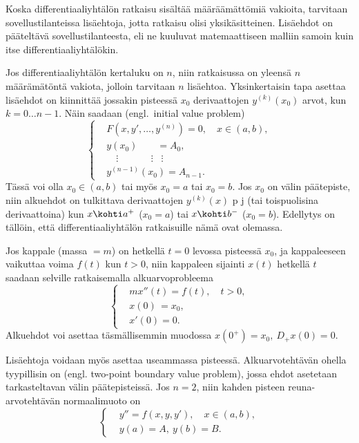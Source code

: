 Koska differentiaaliyhtälön ratkaisu sisältää määräämättömiä vakioita, tarvitaan 
sovellustilanteissa lisäehtoja, jotta ratkaisu olisi yksikäsitteinen. Lisäehdot on pääteltävä 
sovellustilanteesta, eli ne kuuluvat matemaattiseen malliin samoin kuin itse
differentiaaliyhtälökin.

Jos differentiaaliyhtälön kertaluku on $n$, niin ratkaisussa on yleensä $n$ määrämätöntä 
vakiota, jolloin tarvitaan $n$ lisäehtoa. Yksinkertaisin tapa asettaa
lisäehdot on kiinnittää jossakin pisteessä $x_0$ derivaattojen $y^{(k)}(x_0)$ arvot, kun
$k=0\ldots n-1$. Näin saadaan
 (engl.\ initial value problem)
\[
\left\{
\begin{aligned}
&F(x,y',\ldots,y^{(n)}) = 0,\quad x\in (a,b), \\
&y(x_0)\qquad = A_0, \\
&\quad\vdots \qquad\quad\,\ \vdots \; \; \; \vdots \\
&y^{(n-1)}(x_0) = A_{n-1}.
\end{aligned}
\right.
\]
Tässä voi olla $x_0\in(a,b)$ tai myös $x_0=a$ tai $x_0=b$. Jos $x_0$ on välin päätepiste, niin 
alkuehdot on tulkittava derivaattojen $y^{(k)}(x)$ p 
j (tai toispuolisina derivaattoina) kun $x\kohti a^+$ ($x_0=a$) tai 
$x\kohti b^-$ ($x_0=b$). Edellytys on tällöin, että differentiaaliyhtälön ratkaisuille nämä ovat
olemassa.
\begin{Exa}
Jos kappale (massa $=m$) on hetkellä $t=0$ levossa pisteessä $x_0$, ja kappaleeseen vaikuttaa 
voima $f(t)$ kun $t>0$, niin kappaleen sijainti $x(t)$ hetkellä $t$ saadaan selville 
ratkaisemalla alkuarvoprobleema
\[
\left\{ \begin{aligned}
&mx''(t) = f(t),\quad t>0, \\
&x(0)\, = x_0, \\
&x'(0)  = 0.
\end{aligned} \right.
\]
Alkuehdot voi asettaa täsmällisemmin muodossa $x(0^+)=x_0,\ D_+ x(0)=0$. \loppu
\end{Exa}
Lisäehtoja voidaan myös asettaa useammassa pisteessä. Alkuarvotehtävän ohella tyypillisin on
 (engl. two-point boundary value problem), jossa ehdot
asetetaan tarkasteltavan välin päätepisteissä. Jos $n=2$, niin kahden pisteen reuna-arvotehtävän
normaalimuoto on
\[ \left\{ \begin{aligned}
&y'' =f(x,y,y'),\quad x\in(a,b), \\
&y(a)=A, \ y(b)=B.
\end{aligned} \right. \]
